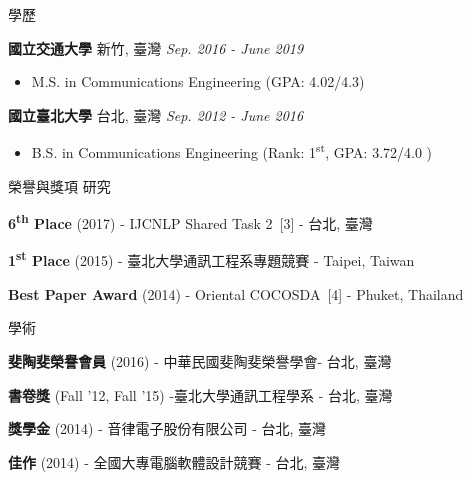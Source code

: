 \documentclass{resume} %
\newcommand{\ts}{\textsuperscript}
\begin{document}

\begin{rSection}{學歷}

{\bf 國立交通大學} \hfill{新竹, 臺灣} \hfill{\em Sep. 2016 - June 2019}
\begin{itemize} \item {M.S. in Communications Engineering (GPA: 4.02/4.3)} \end{itemize}
{\bf 國立臺北大學}\hspace*{2em} \hfill{台北, 臺灣} \hfill{\em Sep. 2012 - June 2016}
\begin{itemize} \item {B.S. in Communications Engineering (Rank: 1\ts{st}, GPA: 3.72/4.0 )} \end{itemize}
\end{rSection}


\begin{rSection}{榮譽與獎項}
    研究
    \begin{rSubsection}{}{}{}{}
    \item {\bf 6\ts{th} Place} (2017) - IJCNLP Shared Task 2~[3] - 台北, 臺灣
    \item {\bf 1\ts{st} Place} (2015) - 臺北大學通訊工程系專題競賽 - Taipei, Taiwan
    \item {\bf Best Paper Award} (2014) - Oriental COCOSDA~[4] - Phuket, Thailand
    \end{rSubsection}
    學術
    \begin{rSubsection}{}{}{}{}
    \item {\bf 斐陶斐榮譽會員} (2016) - 中華民國斐陶斐榮譽學會- 台北, 臺灣 
    \item {\bf 書卷獎} (Fall '12, Fall '15) -臺北大學通訊工程學系 - 台北, 臺灣
    \item {\bf 獎學金} (2014) - 音律電子股份有限公司 - 台北, 臺灣
    \item {\bf 佳作} (2014) - 全國大專電腦軟體設計競賽 - 台北, 臺灣
    \end{rSubsection}
    \end{rSection}
\end{document}
